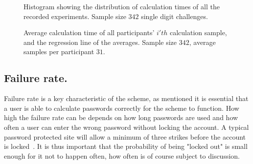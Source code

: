 \begin{figure}
    \centering
    \caption{Histogram showing the distribution of calculation times of all the recorded experiments. Sample size $342$ single digit challenges.}
    \label{histo-calctimes}
\end{figure}


\begin{figure}
    \centering
{}
\caption{Average calculation time of all participants' $i'th$ calculation sample, and the regression line of the averages. Sample size $342$, average samples per participant $31$.}
\label{scatter-regression}
\end{figure}


\subsection{Failure rate.}
Failure rate is a key characteristic of the scheme, as mentioned it is essential that a user is able to calculate passwords correctly for the scheme to function. How high the failure rate can be depends on how long passwords are used and how often a user can enter the wrong password without locking the account. A typical password protected site will allow a minimum of three strikes before the account is locked~\cite{10-strikes}. It is thus important that the probability of being "locked out" is small enough for it not to happen often, how often is of course subject to discussion.

